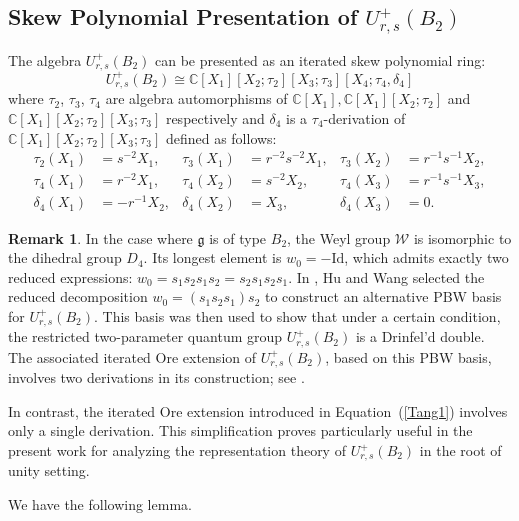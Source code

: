 \documentclass[12 pt,reqno]{amsart}
\numberwithin{equation}{section}
\theoremstyle{definition}
\newtheorem{remark}[thm]{Remark}
\theoremstyle{definition}
\theoremstyle{remark}
\theoremstyle{remark}
\begin{document}
\subsection{\texorpdfstring{Skew Polynomial Presentation of $ U_{r,s}^+(B_2) ${}}{}}\label{Sub2.2} The algebra $U^+_{r,s}(B_2)$ can be presented as an iterated skew polynomial ring:
\begin{equation}\label{Tang1}
U^+_{r,s}(B_2) \cong \mathbb{C}[X_1][X_2;\tau_2][X_3;\tau_3][X_4;\tau_4,\delta_4]
\end{equation}
where $\tau_2$, $\tau_3$, $\tau_4$ are algebra automorphisms of $\mathbb{C}[X_1], \mathbb{C}[X_1][X_2;\tau_2]$ and $\mathbb{C}[X_1][X_2;\tau_2][X_3;\tau_3]$ respectively and $\delta_4$  is a $\tau_4$-derivation of $\mathbb{C}[X_1][X_2;\tau_2][X_3;\tau_3]$ defined as follows:
\begin{align*}
\tau_2(X_1) &= s^{-2}X_1, &\tau_3(X_1) &= r^{-2}s^{-2}X_1, & \tau_3(X_2) &= r^{-1}s^{-1}X_2, \\
\tau_4(X_1) &= r^{-2}X_1, & \tau_4(X_2) &= s^{-2}X_2, & \tau_4(X_3) &= r^{-1}s^{-1}X_3, \\
\delta_4(X_1) &= -r^{-1}X_2, & \delta_4(X_2) &= X_3, & \delta_4(X_3) &= 0.
\end{align*}
\begin{remark} In the case where $\mathfrak{g}$ is of type $B_2$, the Weyl group $\mathcal{W}$ is isomorphic to the dihedral group $D_4$. Its longest element is $w_0 = -\mathrm{Id}$, which admits exactly two reduced expressions: $w_0 = s_1 s_2 s_1 s_2 = s_2 s_1 s_2 s_1$. In \cite[Definition 2.3]{huwang}, Hu and Wang selected the reduced decomposition $w_0 = (s_1 s_2 s_1) s_2$ to construct an alternative PBW basis for $U_{r,s}^+(B_2)$. This basis was then used to show that under a certain
condition, the restricted two-parameter quantum group $U_{r,s}^+(B_2)$  is a Drinfel’d double. The associated iterated Ore extension of $U_{r,s}^+(B_2)$, based on this PBW basis, involves two derivations in its construction; see \cite[Theorem 2.4]{huwang}.

In contrast, the iterated Ore extension introduced in Equation~(\ref{Tang1}) involves only a single derivation. This simplification proves particularly useful in the present work for analyzing the representation theory of $U_{r,s}^+(B_2)$ in the root of unity setting.
\end{remark}
 We have the following lemma.
\end{document}
